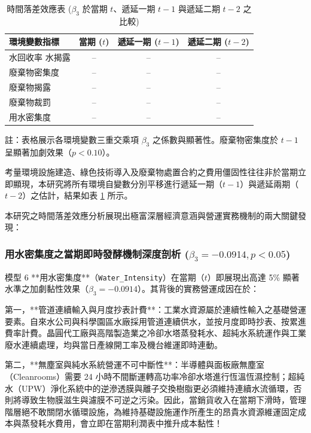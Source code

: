 \documentclass[12pt,a4paper]{article}
\begin{document}
\begin{table}[H]
\centering
\caption{時間落差效應表 ($\beta_3$ 於當期 $t$、遞延一期 $t-1$ 與遞延二期 $t-2$ 之比較)}
\label{tab:lag_reg}
\begin{threeparttable}
\small
\begin{tabular}{lccc}
\toprule
環境變數指標 & 當期 ($t$) & 遞延一期 ($t-1$) & 遞延二期 ($t-2$) \\
\midrule
水回收率%
水揭露 & -- & -- & -- \\
廢棄物密集度 & -- & -- & -- \\
廢棄物揭露 & -- & -- & -- \\
廢棄物裁罰 & -- & -- & -- \\
用水密集度 & -- & -- & -- \\
\bottomrule
\end{tabular}
\begin{tablenotes}
\small
\item 註：表格展示各環境變數三重交乘項 $\beta_3$ 之係數與顯著性。廢棄物密集度於 $t-1$ 呈顯著加劇效果（$p < 0.10$）。
\end{tablenotes}
\end{threeparttable}
\end{table}

考量環境設施建造、綠色技術導入及廢棄物處置合約之費用僵固性往往非於當期立即顯現，本研究將所有環境自變數分別平移進行遞延一期（$t-1$）與遞延兩期（$t-2$）之估計，結果如表 \ref{tab:lag_reg} 所示。

本研究之時間落差效應分析展現出極富深層經濟意涵與營運實務機制的兩大關鍵發現：

\subsubsection{用水密集度之當期即時發酵機制深度剖析 \texorpdfstring{($\beta_3 = -0.0914, p < 0.05$)}{(beta3 = -0.0914, p < 0.05)}}

模型 6 **用水密集度**（\texttt{Water\_Intensity}）在當期（$t$）即展現出高達 5\% 顯著水準之加劇黏性效果（$\beta_3 = -0.0914$）。其背後的實務營運成因在於：

第一，**管道連續輸入與月度抄表計費**：工業水資源屬於連續性輸入之基礎營運要素。自來水公司與科學園區水廠採用管道連續供水，並按月度即時抄表、按累進費率計費。晶圓代工廠與高階製造業之冷卻水塔蒸發耗水、超純水系統運作與工業廢水連續處理，均與當日產線開工率及機台維運即時連動。

第二，**無塵室與純水系統營運不可中斷性**：半導體與面板廠無塵室（Cleanrooms）需要 24 小時不間斷運轉高功率冷卻水塔進行恆溫恆濕控制；超純水（UPW）淨化系統中的逆滲透膜與離子交換樹脂更必須維持連續水流循環，否則將導致生物膜滋生與濾膜不可逆之污染。因此，當銷貨收入在當期下滑時，管理階層絕不敢關閉水循環設施，為維持基礎設施運作所產生的昂貴水資源維運固定成本與蒸發耗水費用，會立即在當期利潤表中推升成本黏性！
\end{document}
